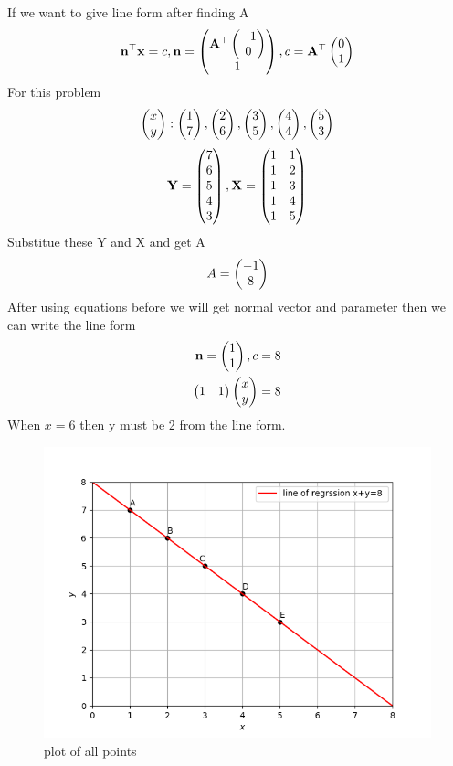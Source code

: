 \documentclass[journal,12pt,twocolumn]{IEEEtran}
\begin{document}
  If we want to give line form after finding A
  \begin{align}
  	\mathbf{n}^{\top}\mathbf{x}=c, \mathbf{n}=\begin{pmatrix}\mathbf{A}^{\top}\begin{pmatrix}-1\\0\end{pmatrix}\\1\end{pmatrix},c=\mathbf{A}^{\top}\begin{pmatrix}0\\1\end{pmatrix}
  \end{align}
	For this problem 
	\begin{align}
		\begin{pmatrix}x \\y \end{pmatrix}:
	\begin{pmatrix}1 \\7 \end{pmatrix},
	\begin{pmatrix}2 \\6 \end{pmatrix},
	\begin{pmatrix}3 \\5 \end{pmatrix},
    \begin{pmatrix}4 \\4 \end{pmatrix},
    \begin{pmatrix}5 \\3 \end{pmatrix}
	\end{align}
\begin{align}
	\mathbf{Y}=\begin{pmatrix}7\\6\\5\\4\\3\end{pmatrix},
	\mathbf{X}=\begin{pmatrix}1&1\\1&2\\1&3\\1&4\\1&5\end{pmatrix}
\end{align}
Substitue these Y and X and get A 
\begin{align}
	A=\begin{pmatrix}-1\\8\end{pmatrix}
\end{align}
	After using equations before we will get normal vector and parameter then we can write the line form
	\begin{align}
		\mathbf{n}=\begin{pmatrix}1\\1\end{pmatrix},c=8\\
		\begin{pmatrix}1 & 1\end{pmatrix}\begin{pmatrix}x\\y\end{pmatrix}=8
	\end{align}
	When $x=6$ then y must be 2 from the line form.
	\begin{figure}[h!]
		\centering
		\includegraphics[width=\columnwidth]{./figs/fig1.png}
		\caption{plot of all points}
		\label{Fig1}
	\end{figure}
	
\end{document}
